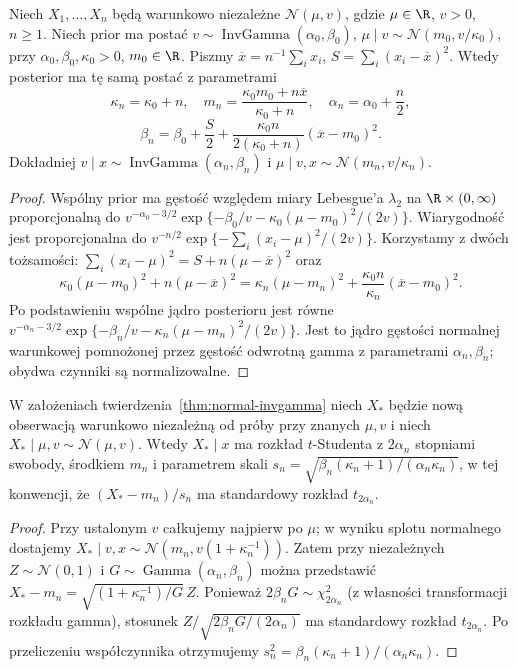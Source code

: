 \begin{twierdzenie}
\label{thm:normal-invgamma}
Niech $X_1,\ldots,X_n$ będą warunkowo niezależne
$\mathcal N(\mu,v)$, gdzie $\mu\in\R$, $v>0$, $n\ge1$.
Niech prior ma postać
$v\sim\operatorname{InvGamma}(\alpha_0,\beta_0)$,
$\mu\mid v\sim\mathcal N(m_0,v/\kappa_0)$,
przy $\alpha_0,\beta_0,\kappa_0>0$, $m_0\in\R$.
Piszmy $\overline x=n^{-1}\sum_ix_i$,
$S=\sum_i(x_i-\overline x)^2$. Wtedy posterior ma tę samą
postać z parametrami
\[
 \kappa_n=\kappa_0+n,\quad
 m_n=\frac{\kappa_0m_0+n\overline x}{\kappa_0+n},\quad
 \alpha_n=\alpha_0+\frac n2,
\]
\[
 \beta_n=\beta_0+\frac S2+
 \frac{\kappa_0n}{2(\kappa_0+n)}(\overline x-m_0)^2.
\]
Dokładniej $v\mid x\sim\operatorname{InvGamma}(\alpha_n,\beta_n)$
i $\mu\mid v,x\sim\mathcal N(m_n,v/\kappa_n)$.
\end{twierdzenie}
\begin{proof}
Wspólny prior ma gęstość względem miary Lebesgue'a $\lambda_2$
na $\R\times(0,\infty)$
proporcjonalną do
$v^{-\alpha_0-3/2}\exp\{-\beta_0/v-
\kappa_0(\mu-m_0)^2/(2v)\}$.
Wiarygodność jest proporcjonalna do
$v^{-n/2}\exp\{-\sum_i(x_i-\mu)^2/(2v)\}$.
Korzystamy z dwóch tożsamości:
$\sum_i(x_i-\mu)^2=S+n(\mu-\overline x)^2$ oraz
\[
 \kappa_0(\mu-m_0)^2+n(\mu-\overline x)^2
 =\kappa_n(\mu-m_n)^2+
 \frac{\kappa_0n}{\kappa_n}(\overline x-m_0)^2.
\]
Po podstawieniu wspólne jądro posterioru jest równe
$v^{-\alpha_n-3/2}\exp\{-\beta_n/v-
\kappa_n(\mu-m_n)^2/(2v)\}$.
Jest to jądro gęstości normalnej warunkowej pomnożonej przez
gęstość odwrotną gamma z parametrami $\alpha_n,\beta_n$;
obydwa czynniki są normalizowalne.
\end{proof}

\begin{wniosek}
\label{cor:student-predictive}
W założeniach twierdzenia~\ref{thm:normal-invgamma}
niech $X_*$ będzie nową obserwacją warunkowo niezależną
od próby przy znanych $\mu,v$ i niech $X_*\mid\mu,v\sim
\mathcal N(\mu,v)$. Wtedy $X_*\mid x$ ma rozkład
$t$-Studenta z $2\alpha_n$ stopniami swobody, środkiem $m_n$
i parametrem skali
$s_n=\sqrt{\beta_n(\kappa_n+1)/(\alpha_n\kappa_n)}$,
w tej konwencji, że $(X_*-m_n)/s_n$ ma standardowy rozkład
$t_{2\alpha_n}$.
\end{wniosek}
\begin{proof}
Przy ustalonym $v$ całkujemy najpierw po $\mu$;
w wyniku splotu normalnego dostajemy
$X_*\mid v,x\sim\mathcal N(m_n,v(1+\kappa_n^{-1}))$.
Zatem przy niezależnych $Z\sim\mathcal N(0,1)$
i $G\sim\operatorname{Gamma}(\alpha_n,\beta_n)$
można przedstawić $X_*-m_n=\sqrt{(1+\kappa_n^{-1})/G}\,Z$.
Ponieważ $2\beta_n G\sim\chi^2_{2\alpha_n}$
(z własności transformacji rozkładu gamma), stosunek
$Z/\sqrt{2\beta_nG/(2\alpha_n)}$ ma standardowy rozkład
$t_{2\alpha_n}$. Po przeliczeniu współczynnika otrzymujemy
$s_n^2=\beta_n(\kappa_n+1)/(\alpha_n\kappa_n)$.
\end{proof}

